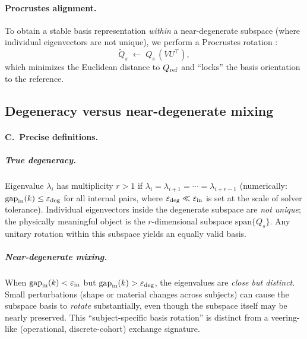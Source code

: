 \documentclass[11pt]{article}
\begin{document}
\paragraph{Procrustes alignment.}
To obtain a stable basis representation \emph{within} a near-degenerate subspace (where individual eigenvectors are not unique), we perform a Procrustes rotation \citep{Schoenemann1966Procrustes}:
\begin{equation}\label{eq:procrustes}
\widetilde Q_s \;\leftarrow\; Q_s\,(V U^\top),
\end{equation}
which minimizes the Euclidean distance to $Q_{\rm ref}$ and ``locks'' the basis orientation to the reference.

\subsection{Degeneracy versus near-degenerate mixing}
\label{sec:degeneracy}

\paragraph{C.\ Precise definitions.}

\subparagraph{True degeneracy.}
Eigenvalue $\lambda_i$ has multiplicity $r>1$ if $\lambda_i=\lambda_{i+1}=\cdots=\lambda_{i+r-1}$ (numerically: $\mathrm{gap}_{\rm in}(k)\le\varepsilon_{\rm deg}$ for all internal pairs, where $\varepsilon_{\rm deg}\ll\varepsilon_{\rm in}$ is set at the scale of solver tolerance).
Individual eigenvectors inside the degenerate subspace are \emph{not unique}; the physically meaningful object is the $r$-dimensional subspace $\mathrm{span}\{Q_s\}$.
Any unitary rotation within this subspace yields an equally valid basis.

\subparagraph{Near-degenerate mixing.}
When $\mathrm{gap}_{\rm in}(k)<\varepsilon_{\rm in}$ but $\mathrm{gap}_{\rm in}(k)>\varepsilon_{\rm deg}$, the eigenvalues are \emph{close but distinct}.
Small perturbations (shape or material changes across subjects) can cause the subspace basis to \emph{rotate} substantially, even though the subspace itself may be nearly preserved.
This ``subject-specific basis rotation'' is distinct from a veering-like (operational, discrete-cohort) exchange signature.
\end{document}
